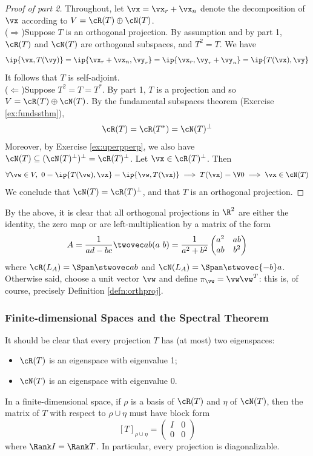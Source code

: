   
\begin{proof}[Proof of part 2]
Throughout, let $\vx=\vx_r+\vx_n$ denote the decomposition of $\vx$ according to $V=\cR(T)\oplus\cN(T)$.\\[5pt]
($\Rightarrow$)\quad Suppose $T$ is an orthogonal projection. By assumption and by part 1, $\cR(T)$ and $\cN(T)$ are orthogonal subspaces, and $T^2=T$. We have
\[\ip{\vx,T(\vy)}=\ip{\vx_r+\vx_n,\vy_r}=\ip{\vx_r,\vy_r+\vy_n}=\ip{T(\vx),\vy}\]
It follows that $T$ is self-adjoint.\\[5pt]
($\Leftarrow$)\quad Suppose $T^2=T=T^*$. By part 1, $T$ is a projection and so $V=\cR(T)\oplus\cN(T)$. By the fundamental subspaces theorem (Exercise \ref{ex:fundssthm}),
\[\cR(T)=\cR(T^*)=\cN(T)^\perp\]
Moreover, by Exercise \ref{ex:uperpperp}, we also have $\cN(T)\subseteq(\cN(T)^\perp)^\perp=\cR(T)^\perp$. Let $\vx\in\cR(T)^\perp$. Then
\[\forall\vw\in V,\ 0=\ip{T(\vw),\vx}=\ip{\vw,T(\vx)}\implies T(\vx)=\V0\implies \vx\in\cN(T)\]
We conclude that $\cN(T)=\cR(T)^\perp$, and that $T$ is an orthogonal projection.
\end{proof}
  
\begin{example}{}{}
By the above, it is clear that all orthogonal projections in $\R^2$ are either the identity, the zero map or are left-multiplication by a matrix of the form 
\[A=\frac 1{ad-bc}\twovec ab(a\ b)=\frac 1{a^2+b^2}\begin{pmatrix}
a^2&ab\\ab&b^2
\end{pmatrix}\]
where $\cR(L_A)=\Span\stwovec ab$ and $\cN(L_A)=\Span\stwovec{-b}a$. Otherwise said, choose a unit vector $\vw$ and define $\pi_{\vw}=\vw\vw^T$: this is, of course, precisely Definition \ref{defn:orthproj}.
\end{example}
  
  
\subsubsection*{Finite-dimensional Spaces and the Spectral Theorem}

It should be clear that every projection $T$ has (at most) two eigenspaces:
\begin{itemize}
  \item $\cR(T)$ is an eigenspace with eigenvalue 1;
  \item $\cN(T)$ is an eigenspace with eigenvalue 0.
\end{itemize}
In a finite-dimensional space, if $\rho$ is a basis of $\cR(T)$ and $\eta$ of $\cN(T)$, then the matrix of $T$ with respect to $\rho\cup\eta$ must have block form
\[[T]_{\rho\cup\eta} =\left(\begin{array}{c|c}
I&0\\\hline
0&0
\end{array}\right)\]
where $\Rank I=\Rank T$. In particular, every projection is diagonalizable.\\


